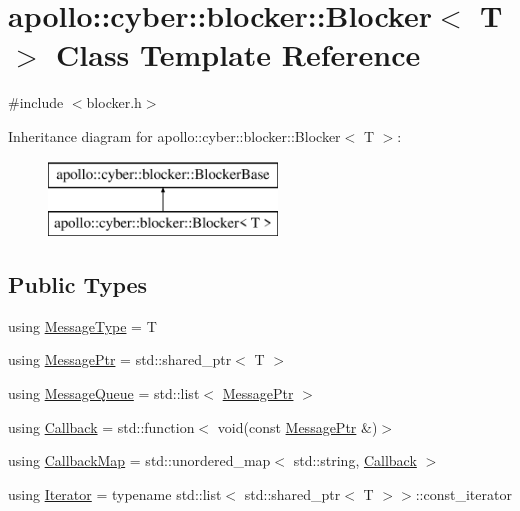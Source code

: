 \hypertarget{classapollo_1_1cyber_1_1blocker_1_1Blocker}{\section{apollo\-:\-:cyber\-:\-:blocker\-:\-:Blocker$<$ T $>$ Class Template Reference}
\label{classapollo_1_1cyber_1_1blocker_1_1Blocker}
}


{\ttfamily \#include $<$blocker.\-h$>$}

Inheritance diagram for apollo\-:\-:cyber\-:\-:blocker\-:\-:Blocker$<$ T $>$\-:\begin{figure}[H]
\begin{center}
\leavevmode
\includegraphics[height=2.000000cm]{classapollo_1_1cyber_1_1blocker_1_1Blocker}
\end{center}
\end{figure}
\subsection*{Public Types}
\begin{DoxyCompactItemize}
\item 
using \hyperlink{classapollo_1_1cyber_1_1blocker_1_1Blocker_ab6f5eb86a03109c66581e377a896650a}{Message\-Type} = T
\item 
using \hyperlink{classapollo_1_1cyber_1_1blocker_1_1Blocker_acfdb26545f6e05820e043a22ed91ed1d}{Message\-Ptr} = std\-::shared\-\_\-ptr$<$ T $>$
\item 
using \hyperlink{classapollo_1_1cyber_1_1blocker_1_1Blocker_a4c973a5afc09ca2b666f9436f2e74189}{Message\-Queue} = std\-::list$<$ \hyperlink{classapollo_1_1cyber_1_1blocker_1_1Blocker_acfdb26545f6e05820e043a22ed91ed1d}{Message\-Ptr} $>$
\item 
using \hyperlink{classapollo_1_1cyber_1_1blocker_1_1Blocker_aadf3f89fd884e1d9d2464172ede9213f}{Callback} = std\-::function$<$ void(const \hyperlink{classapollo_1_1cyber_1_1blocker_1_1Blocker_acfdb26545f6e05820e043a22ed91ed1d}{Message\-Ptr} \&)$>$
\item 
using \hyperlink{classapollo_1_1cyber_1_1blocker_1_1Blocker_ace3015075930b98718441655315002d5}{Callback\-Map} = std\-::unordered\-\_\-map$<$ std\-::string, \hyperlink{classapollo_1_1cyber_1_1blocker_1_1Blocker_aadf3f89fd884e1d9d2464172ede9213f}{Callback} $>$
\item 
using \hyperlink{classapollo_1_1cyber_1_1blocker_1_1Blocker_a62c6fc3bb53c24ed9dd2bc69bdad7e3d}{Iterator} = typename std\-::list$<$ std\-::shared\-\_\-ptr$<$ T $>$$>$\-::const\-\_\-iterator
\end{DoxyCompactItemize}
